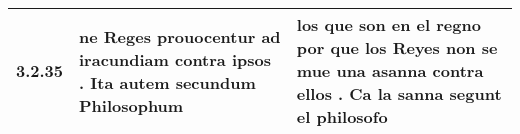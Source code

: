 \begin{tabular}{|p{1cm}|p{6.5cm}|p{6.5cm}|}

\hline
3.2.35 & ne Reges prouocentur \textbf{ ad iracundiam contra ipsos . } Ita autem secundum Philosophum & los que son en el regno \textbf{ por que los Reyes non se mue una asanna contra ellos . } Ca la sanna segunt el philosofo \\\hline

\end{tabular}
